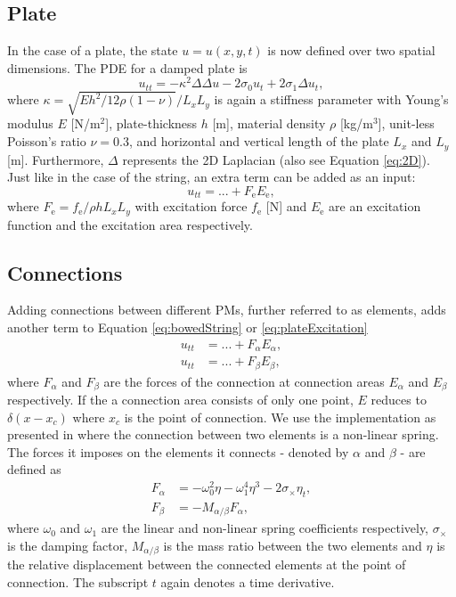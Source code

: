 \documentclass{article}
\begin{document}
\subsection{Plate}\label{subsec:platePDE}
In the case of a plate, the state $u = u(x,y,t)$ is now defined over two spatial dimensions. The PDE for a damped plate is \cite{Bilbao2009:NumericalSoundSynthesis}
\begin{equation}\label{eq:platePDE}
    u_{tt} = -\kappa^2 \Delta\Delta u - 2 \sigma_0 u_{t} + 2\sigma_1 \Delta u_{t},
\end{equation}
where $\kappa = \sqrt{Eh^2/12\rho(1-\nu)}/L_xL_y$ is again a stiffness parameter with Young's modulus $E$ [N/m$^2$], plate-thickness $h$ [m], material density $\rho$ [kg/m$^3$], unit-less Poisson's ratio $\nu = 0.3$, and horizontal and vertical length of the plate $L_x$ and $L_y$ [m]. Furthermore, $\Delta$ represents the 2D Laplacian (also see Equation \eqref{eq:2D}). Just like in the case of the string, an extra term can be added as an input:
\begin{equation}\label{eq:plateExcitation}
    u_{tt} = ... + F_\text{e}E_\text{e},
\end{equation}
where $F_\text{e} = f_\text{e} / \rho h L_xL_y $ with excitation force $f_\text{e}$ [N] and $E_\text{e}$ are an excitation function and the excitation area respectively. 

\subsection{Connections}\label{sec:connections}
Adding connections between different PMs, further referred to as elements, adds another term to Equation \eqref{eq:bowedString} or \eqref{eq:plateExcitation}
\begin{align}
    u_{tt} &= ... + F_\alpha E_\alpha, \\
    u_{tt} &= ... + F_\beta E_\beta,
\end{align}
where $F_\alpha$ and $F_\beta$ are the forces of the connection at connection areas $E_\alpha$ and $E_\beta$ respectively. If the a connection area consists of only one point, $E$ reduces to $\delta(x-x_c)$ where $x_c$ is the point of connection. We use the implementation as presented in \cite{Bilbao2009:ModularPercussion} where the connection between two elements is a non-linear spring. The forces it imposes on the elements it connects - denoted by $\alpha$ and $\beta$ - are defined as
\begin{align}
    F_\alpha &= -\omega_0^2\eta - \omega_1^4\eta^3 - 2\sigma_\times\eta_t,\\
    F_\beta &= -M_{\alpha/\beta}F_\alpha,
\end{align}
where $\omega_0$ and $\omega_1$ are the linear and non-linear spring coefficients respectively, $\sigma_\times$ is the damping factor, $M_{\alpha/\beta}$ is the mass ratio between the two elements and $\eta$ is the relative displacement between the connected elements at the point of connection. The subscript $t$ again denotes a time derivative.
\end{document}
